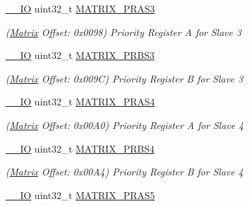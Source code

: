 \begin{DoxyCompactItemize}
\mbox{\hyperlink{core__cm7_8h_aec43007d9998a0a0e01faede4133d6be}{\+\_\+\+\_\+\+IO}} uint32\+\_\+t \mbox{\hyperlink{structMatrix_af8f346c476ac33816154e907610beba1}{M\+A\+T\+R\+I\+X\+\_\+\+P\+R\+A\+S3}}
\begin{DoxyCompactList}\small\item\em (\mbox{\hyperlink{structMatrix}{Matrix}} Offset\+: 0x0098) Priority Register A for Slave 3 \end{DoxyCompactList}\item 
\mbox{\label{structMatrix_a47e5aaa815e3d45931b7fefd8df56c08}} 
\mbox{\hyperlink{core__cm7_8h_aec43007d9998a0a0e01faede4133d6be}{\+\_\+\+\_\+\+IO}} uint32\+\_\+t \mbox{\hyperlink{structMatrix_a47e5aaa815e3d45931b7fefd8df56c08}{M\+A\+T\+R\+I\+X\+\_\+\+P\+R\+B\+S3}}
\begin{DoxyCompactList}\small\item\em (\mbox{\hyperlink{structMatrix}{Matrix}} Offset\+: 0x009C) Priority Register B for Slave 3 \end{DoxyCompactList}\item 
\mbox{\label{structMatrix_ac1064b9b162bd528dd61da262b7534bb}} 
\mbox{\hyperlink{core__cm7_8h_aec43007d9998a0a0e01faede4133d6be}{\+\_\+\+\_\+\+IO}} uint32\+\_\+t \mbox{\hyperlink{structMatrix_ac1064b9b162bd528dd61da262b7534bb}{M\+A\+T\+R\+I\+X\+\_\+\+P\+R\+A\+S4}}
\begin{DoxyCompactList}\small\item\em (\mbox{\hyperlink{structMatrix}{Matrix}} Offset\+: 0x00\+A0) Priority Register A for Slave 4 \end{DoxyCompactList}\item 
\mbox{\label{structMatrix_a8d49f793acf391c3994bfd01a6d13b96}} 
\mbox{\hyperlink{core__cm7_8h_aec43007d9998a0a0e01faede4133d6be}{\+\_\+\+\_\+\+IO}} uint32\+\_\+t \mbox{\hyperlink{structMatrix_a8d49f793acf391c3994bfd01a6d13b96}{M\+A\+T\+R\+I\+X\+\_\+\+P\+R\+B\+S4}}
\begin{DoxyCompactList}\small\item\em (\mbox{\hyperlink{structMatrix}{Matrix}} Offset\+: 0x00\+A4) Priority Register B for Slave 4 \end{DoxyCompactList}\item 
\mbox{\label{structMatrix_ae621b78f06fd106c3460f791d13be34d}} 
\mbox{\hyperlink{core__cm7_8h_aec43007d9998a0a0e01faede4133d6be}{\+\_\+\+\_\+\+IO}} uint32\+\_\+t \mbox{\hyperlink{structMatrix_ae621b78f06fd106c3460f791d13be34d}{M\+A\+T\+R\+I\+X\+\_\+\+P\+R\+A\+S5}}

\end{DoxyCompactItemize}
